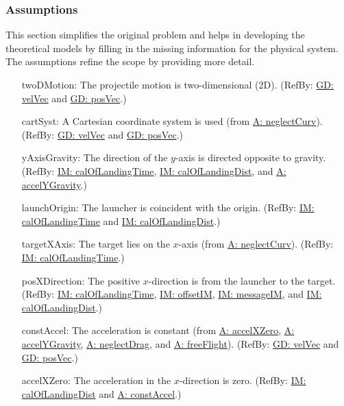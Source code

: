\documentclass[12pt]{article}
\begin{document}
\subsubsection{Assumptions}
\label{Sec:Assumps}
This section simplifies the original problem and helps in developing the theoretical models by filling in the missing information for the physical system. The assumptions refine the scope by providing more detail.
\begin{itemize}
\item[twoDMotion:\phantomsection\label{twoDMotion}]The projectile motion is two-dimensional (2D). (RefBy: \hyperref[GD:velVec]{GD: velVec} and \hyperref[GD:posVec]{GD: posVec}.)
\item[cartSyst:\phantomsection\label{cartSyst}]A Cartesian coordinate system is used (from \hyperref[neglectCurv]{A: neglectCurv}). (RefBy: \hyperref[GD:velVec]{GD: velVec} and \hyperref[GD:posVec]{GD: posVec}.)
\item[yAxisGravity:\phantomsection\label{yAxisGravity}]The direction of the $y$-axis is directed opposite to gravity. (RefBy: \hyperref[IM:calOfLandingTime]{IM: calOfLandingTime}, \hyperref[IM:calOfLandingDist]{IM: calOfLandingDist}, and \hyperref[accelYGravity]{A: accelYGravity}.)
\item[launchOrigin:\phantomsection\label{launchOrigin}]The launcher is coincident with the origin. (RefBy: \hyperref[IM:calOfLandingTime]{IM: calOfLandingTime} and \hyperref[IM:calOfLandingDist]{IM: calOfLandingDist}.)
\item[targetXAxis:\phantomsection\label{targetXAxis}]The target lies on the $x$-axis (from \hyperref[neglectCurv]{A: neglectCurv}). (RefBy: \hyperref[IM:calOfLandingTime]{IM: calOfLandingTime}.)
\item[posXDirection:\phantomsection\label{posXDirection}]The positive $x$-direction is from the launcher to the target. (RefBy: \hyperref[IM:calOfLandingTime]{IM: calOfLandingTime}, \hyperref[IM:offsetIM]{IM: offsetIM}, \hyperref[IM:messageIM]{IM: messageIM}, and \hyperref[IM:calOfLandingDist]{IM: calOfLandingDist}.)
\item[constAccel:\phantomsection\label{constAccel}]The acceleration is constant (from \hyperref[accelXZero]{A: accelXZero}, \hyperref[accelYGravity]{A: accelYGravity}, \hyperref[neglectDrag]{A: neglectDrag}, and \hyperref[freeFlight]{A: freeFlight}). (RefBy: \hyperref[GD:velVec]{GD: velVec} and \hyperref[GD:posVec]{GD: posVec}.)
\item[accelXZero:\phantomsection\label{accelXZero}]The acceleration in the $x$-direction is zero. (RefBy: \hyperref[IM:calOfLandingDist]{IM: calOfLandingDist} and \hyperref[constAccel]{A: constAccel}.)

\end{itemize}
\end{document}
